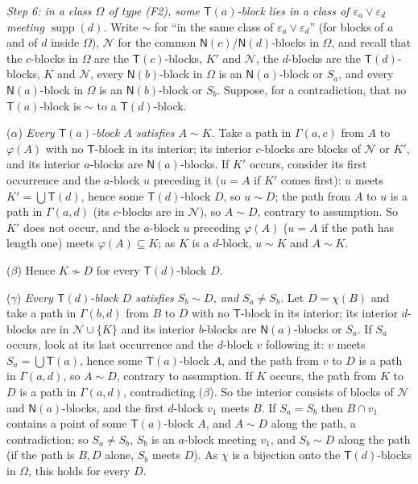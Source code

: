 \documentclass[11pt]{amsart}
\theoremstyle{definition}
\newcommand{\supp}{\operatorname{supp}}
\newcommand{\T}{\mathsf{T}}
\newcommand{\N}{\mathsf{N}}
\begin{document}
\smallskip
\emph{Step 6: in a class $\Omega$ of type \textup{(F2)}, some $\T(a)$-block lies in a class of $\varepsilon_a\vee\varepsilon_d$ meeting $\supp(d)$.} Write $\sim$ for ``in the same class of $\varepsilon_a\vee\varepsilon_d$'' (for blocks of $a$ and of $d$ inside $\Omega$), $\mathcal N$ for the common $\N(c)$/$\N(d)$-blocks in $\Omega$, and recall that the $c$-blocks in $\Omega$ are the $\T(c)$-blocks, $K'$ and $\mathcal N$, the $d$-blocks are the $\T(d)$-blocks, $K$ and $\mathcal N$, every $\N(b)$-block in $\Omega$ is an $\N(a)$-block or $S_a$, and every $\N(a)$-block in $\Omega$ is an $\N(b)$-block or $S_b$. Suppose, for a contradiction, that no $\T(a)$-block is $\sim$ to a $\T(d)$-block.

($\alpha$) \emph{Every $\T(a)$-block $A$ satisfies $A\sim K$.} Take a path in $\Gamma(a,c)$ from $A$ to $\varphi(A)$ with no $\T$-block in its interior; its interior $c$-blocks are blocks of $\mathcal N$ or $K'$, and its interior $a$-blocks are $\N(a)$-blocks. If $K'$ occurs, consider its first occurrence and the $a$-block $u$ preceding it ($u=A$ if $K'$ comes first): $u$ meets $K'=\bigcup\T(d)$, hence some $\T(d)$-block $D$, so $u\sim D$; the path from $A$ to $u$ is a path in $\Gamma(a,d)$ (its $c$-blocks are in $\mathcal N$), so $A\sim D$, contrary to assumption. So $K'$ does not occur, and the $a$-block $u$ preceding $\varphi(A)$ ($u=A$ if the path has length one) meets $\varphi(A)\subseteq K$; as $K$ is a $d$-block, $u\sim K$ and $A\sim K$.

($\beta$) Hence $K\not\sim D$ for every $\T(d)$-block $D$.

($\gamma$) \emph{Every $\T(d)$-block $D$ satisfies $S_b\sim D$, and $S_a\ne S_b$.} Let $D=\chi(B)$ and take a path in $\Gamma(b,d)$ from $B$ to $D$ with no $\T$-block in its interior; its interior $d$-blocks are in $\mathcal N\cup\{K\}$ and its interior $b$-blocks are $\N(a)$-blocks or $S_a$. If $S_a$ occurs, look at its last occurrence and the $d$-block $v$ following it: $v$ meets $S_a=\bigcup\T(a)$, hence some $\T(a)$-block $A$, and the path from $v$ to $D$ is a path in $\Gamma(a,d)$, so $A\sim D$, contrary to assumption. If $K$ occurs, the path from $K$ to $D$ is a path in $\Gamma(a,d)$, contradicting ($\beta$). So the interior consists of blocks of $\mathcal N$ and $\N(a)$-blocks, and the first $d$-block $v_1$ meets $B$. If $S_a=S_b$ then $B\cap v_1$ contains a point of some $\T(a)$-block $A$, and $A\sim D$ along the path, a contradiction; so $S_a\ne S_b$, $S_b$ is an $a$-block meeting $v_1$, and $S_b\sim D$ along the path (if the path is $B,D$ alone, $S_b$ meets $D$). As $\chi$ is a bijection onto the $\T(d)$-blocks in $\Omega$, this holds for every $D$.
\end{document}
